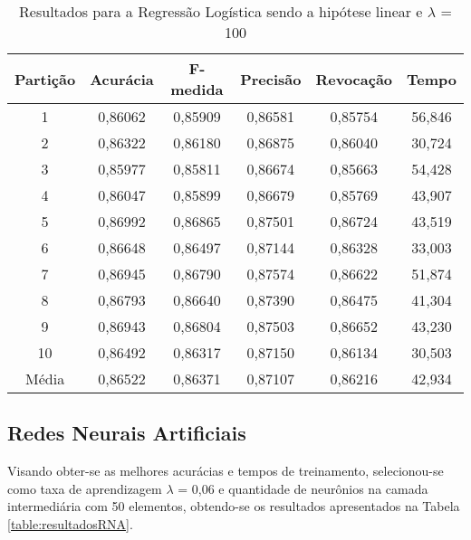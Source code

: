 \begin{table}[h]
\centering
\caption{Resultados para a Regressão Logística sendo a hipótese linear e \(\lambda\) = 100}
\vspace{0.2cm}
\begin{tabular}{c|c|c|c|c|c}
Partição & Acurácia & F-medida & Precisão & Revocação & Tempo \\
\hline
1  & 0,86062 & 0,85909 & 0,86581 & 0,85754 & 56,846 \\      
2  & 0,86322 & 0,86180 & 0,86875 & 0,86040 & 30,724 \\      
3  & 0,85977 & 0,85811 & 0,86674 & 0,85663 & 54,428 \\      
4  & 0,86047 & 0,85899 & 0,86679 & 0,85769 & 43,907 \\      
5  & 0,86992 & 0,86865 & 0,87501 & 0,86724 & 43,519 \\      
6  & 0,86648 & 0,86497 & 0,87144 & 0,86328 & 33,003 \\      
7  & 0,86945 & 0,86790 & 0,87574 & 0,86622 & 51,874 \\    
8  & 0,86793 & 0,86640 & 0,87390 & 0,86475 & 41,304 \\      
9  & 0,86943 & 0,86804 & 0,87503 & 0,86652 & 43,230 \\      
10 & 0,86492 & 0,86317 & 0,87150 & 0,86134 & 30,503 \\
\hline
Média & 0,86522 & 0,86371 & 0,87107 & 0,86216 & 42,934

\end{tabular} 
\label{table:resultadosRL}
\end{table}

\subsection{Redes Neurais Artificiais}
	
	Visando obter-se as melhores acurácias e tempos de treinamento, selecionou-se como taxa de aprendizagem \(\lambda\) = 0,06 e quantidade de neurônios na camada intermediária com 50 elementos, obtendo-se os resultados apresentados na Tabela \ref{table:resultadosRNA}.
	
